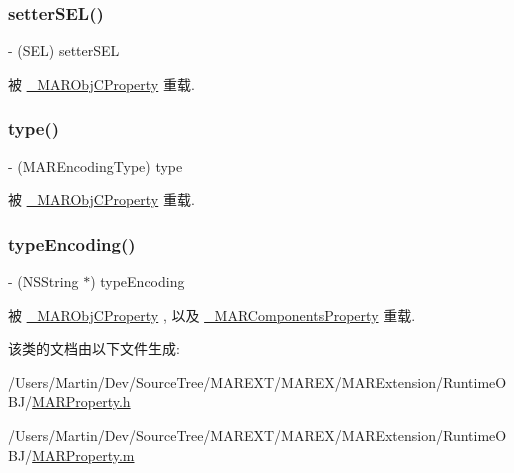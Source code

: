 \subsubsection{\texorpdfstring{setter\+S\+E\+L()}{setterSEL()}}
{\footnotesize\ttfamily -\/ (S\+EL) setter\+S\+EL \begin{DoxyParamCaption}{ }\end{DoxyParamCaption}}



被 \hyperlink{interface___m_a_r_obj_c_property_af150258daa039e9f73a821b16c12d4c0}{\+\_\+\+M\+A\+R\+Obj\+C\+Property} 重载.

\mbox{\label{interface_m_a_r_property_a577fc2e87b80221d05c18b6f41b92643}} 
\subsubsection{\texorpdfstring{type()}{type()}}
{\footnotesize\ttfamily -\/ (M\+A\+R\+Encoding\+Type) type \begin{DoxyParamCaption}{ }\end{DoxyParamCaption}}



被 \hyperlink{interface___m_a_r_obj_c_property_a6b611388f65922c109a1056d48fb384f}{\+\_\+\+M\+A\+R\+Obj\+C\+Property} 重载.

\mbox{\label{interface_m_a_r_property_a65951e9300a6499c06ad33867773b8d7}} 
\subsubsection{\texorpdfstring{type\+Encoding()}{typeEncoding()}}
{\footnotesize\ttfamily -\/ (N\+S\+String $\ast$) type\+Encoding \begin{DoxyParamCaption}{ }\end{DoxyParamCaption}}



被 \hyperlink{interface___m_a_r_obj_c_property_a7dfceeb0bb1ec7976f284a1ffcc6ec5f}{\+\_\+\+M\+A\+R\+Obj\+C\+Property} , 以及 \hyperlink{interface___m_a_r_components_property_a9ce943079d252a965552e32a44193840}{\+\_\+\+M\+A\+R\+Components\+Property} 重载.



该类的文档由以下文件生成\+:\begin{DoxyCompactItemize}
\item 
/\+Users/\+Martin/\+Dev/\+Source\+Tree/\+M\+A\+R\+E\+X\+T/\+M\+A\+R\+E\+X/\+M\+A\+R\+Extension/\+Runtime\+O\+B\+J/\hyperlink{_m_a_r_property_8h}{M\+A\+R\+Property.\+h}\item 
/\+Users/\+Martin/\+Dev/\+Source\+Tree/\+M\+A\+R\+E\+X\+T/\+M\+A\+R\+E\+X/\+M\+A\+R\+Extension/\+Runtime\+O\+B\+J/\hyperlink{_m_a_r_property_8m}{M\+A\+R\+Property.\+m}\end{DoxyCompactItemize}
